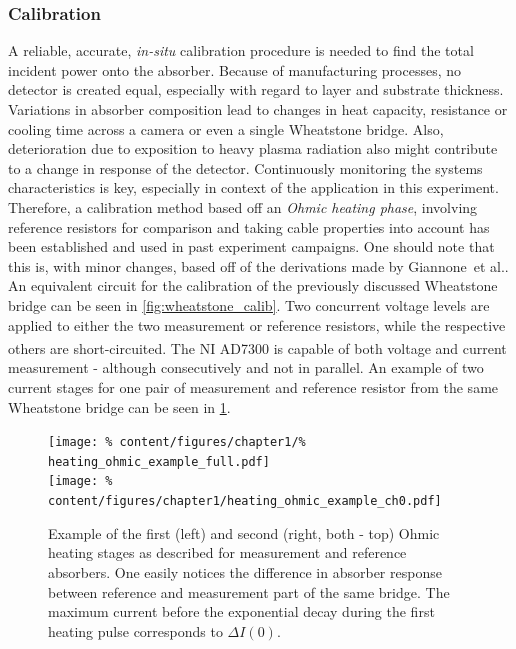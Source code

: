             \subsubsection*{Calibration}%
%
                A reliable, accurate, \textit{in-situ} calibration procedure is needed to find the total incident power onto the absorber. Because of manufacturing processes, no detector is created equal, especially with regard to layer and substrate thickness. Variations in absorber composition lead to changes in heat capacity, resistance or cooling time across a camera or even a single Wheatstone bridge. Also, deterioration due to exposition to heavy plasma radiation also might contribute to a change in response of the detector. Continuously monitoring the systems characteristics is key, especially in context of the application in this experiment. Therefore, a calibration method based off an \textit{Ohmic heating phase}, involving reference resistors for comparison and taking cable properties into account has been established and used in past experiment campaigns. One should note that this is, with minor changes, based off of the derivations made by Giannone~et al.\cite{Giannone2002}.\\%
                An equivalent circuit for the calibration of the previously discussed Wheatstone bridge can be seen in \cref{fig:wheatstone_calib}. Two concurrent voltage levels are applied to either the two measurement or reference resistors, while the respective others are short-circuited. The NI\textsuperscript{\textregistered} AD7300 is capable of both voltage and current measurement - although consecutively and not in parallel. An example of two current stages for one pair of measurement and reference resistor from the same Wheatstone bridge can be seen in \cref{fig:ohmicheating}.\\%
%
                \begin{figure}[t]%
                    \centering%
                    \texttt{[image: \%
                        content/figures/chapter1/\%
                        heating\_ohmic\_example\_full.pdf]}\\%
                    \texttt{[image: \%
                        content/figures/chapter1/heating\_ohmic\_example\_ch0.pdf]}%
                    \caption{Example of the first (left) and second (right, both - top) Ohmic heating stages as described for measurement and reference absorbers. One easily notices the difference in absorber response between reference and measurement part of the same bridge. The maximum current before the exponential decay during the first heating pulse corresponds to $\Delta I\left(0\right)$.}\label{fig:ohmicheating}%
                \end{figure}%
